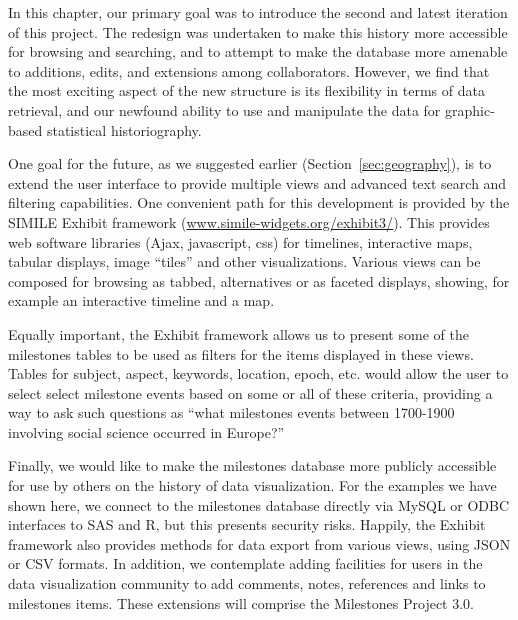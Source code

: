 \documentclass[11pt]{article}
\newcommand*{\secref}[1]{Section~\ref{#1}}
\begin{document}
In this chapter, our primary goal was to introduce the second and latest iteration of this project.  The redesign was undertaken to make this history more accessible for browsing and searching, and to attempt to make the database more amenable to additions, edits, and extensions among collaborators.  However, we find that the most exciting aspect of the new structure is its flexibility in terms of data retrieval, 
and our newfound ability to use and manipulate the data for graphic-based statistical historiography.

One goal for the future, as we suggested earlier (\secref{sec:geography}), is to extend the user interface to provide multiple
views and advanced text search and filtering capabilities.
One convenient path for this development is provided by the SIMILE Exhibit framework
(\url{www.simile-widgets.org/exhibit3/}).  This provides web software libraries (Ajax, javascript, css) for
timelines, interactive maps, tabular displays, image ``tiles'' and other visualizations.
Various views can be composed for browsing as tabbed, alternatives or as faceted displays, showing, for example an interactive timeline and
a map.

Equally important, the Exhibit framework allows us to present some of the milestones tables to be used as filters for the items
displayed in these views.  Tables for subject, aspect, keywords, location, epoch, etc. would allow the user to select
select milestone events based on some or all of these criteria, providing a way to ask such questions as
``what milestones events between 1700-1900 involving social science occurred in Europe?'' 

Finally, we would like to make the milestones database more publicly accessible for use by others on the history of data
visualization.  For the examples we have shown here, we connect to the milestones database directly via MySQL or ODBC
interfaces to SAS and R, but this presents security risks.  Happily, the Exhibit framework also provides methods for
data export from various views, using JSON or CSV formats. In addition, we contemplate adding facilities for users in
the data visualization community to add comments, notes, references and links to milestones items.
These extensions will comprise the Milestones Project 3.0.

%
\end{document}
